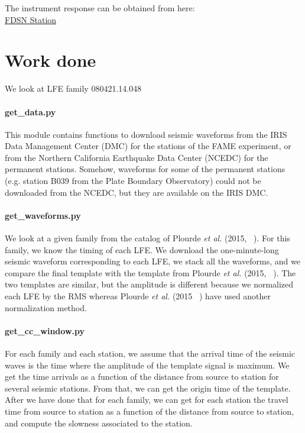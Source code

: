 \documentclass[workdone.tex]{subfiles}
\begin{document}
The instrument response can be obtained from here: \\

\href{http://service.ncedc.org/fdsnws/station/1/#description-box}{FDSN Station}

\section{Work done}

We look at LFE family 080421.14.048

\paragraph{get\_data.py} This module contains functions to download seismic waveforms from the IRIS Data Management Center (DMC) for the stations of the FAME experiment, or from the Northern California Earthquake Data Center (NCEDC) for the permanent stations. Somehow, waveforms for some of the permanent stations (e.g. station B039 from the Plate Boundary Observatory) could not be downloaded from the NCEDC, but they are available on the IRIS DMC.

\paragraph{get\_waveforms.py} We look at a given family from the catalog of Plourde \textit{et al.} (2015, ~\cite{PLO_2015}). For this family, we know the timing of each LFE. We download the one-minute-long seismic waveform corresponding to each LFE, we stack all the waveforms, and we compare the final template with the template from Plourde \textit{et al.} (2015, ~\cite{PLO_2015}). The two templates are similar, but the amplitude is different because we normalized each LFE by the RMS whereas Plourde \textit{et al.} (2015 ~\cite{PLO_2015}) have used another normalization method.

\paragraph{get\_cc\_window.py} For each family and each station, we assume that the arrival time of the seismic waves is the time where the amplitude of the template signal is maximum. We get the time arrivals as a function of the distance from source to station for several seismic stations. From that, we can get the origin time of the template. After we have done that for each family, we can get for each station the travel time from source to station as a function of the distance from source to station, and compute the slowness associated to the station.
\end{document}
